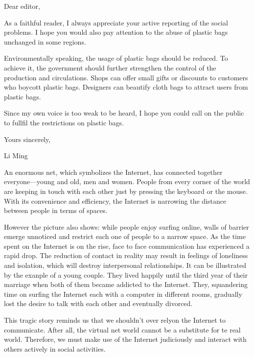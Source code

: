 Dear editor,

As a faithful reader, I always appreciate your active reporting of the social problems. I hope you would also pay attention to the abuse of plastic bags unchanged in some regions.

Environmentally speaking, the usage of plastic bags should be reduced. To achieve it, the government should further strengthen the control of the production and circulations. Shops can offer small gifts or discounts to customers who boycott plastic bags. Designers can beautify cloth bags to attract users from plastic bags.

Since my own voice is too weak to be heard, I hope you could call on the public to fullfil the restrictions on plastic bags.

\begin{flushright}Yours sincerely,

Li Ming\end{flushright}

An enormous net, which symbolizes the Internet, has connected together everyone---young and old, men and women. People from every corner of the world are keeping in touch with each other just by pressing the keyboard or the mouse. With its convenience and efficiency, the Internet is narrowing the distance between people in terms of spaces.

However the picture also shows: while people enjoy surfing online, walls of barrier emerge unnoticed and restrict each one of people to a narrow space. As the time spent on the Internet is on the rise, face to face communication has experienced a rapid drop. The reduction of contact in reality may result in feelings of loneliness and isolation, which will destroy interpersonal relationships. It can be illustrated by the exanple of a young couple. They lived happily until the third year of their marriage when both of them became addicted to the Internet. They, squandering time on surfing the Internet each with a computer in different rooms, gradually lost the desire to talk with each other and eventually divorced.

This tragic story reminds us that we shouldn't over relyon the Internet to communicate. After all, the virtual net world cannot be a substitute for te real world. Therefore, we must make use of the Internet judiciously and interact with others actively in social activities.